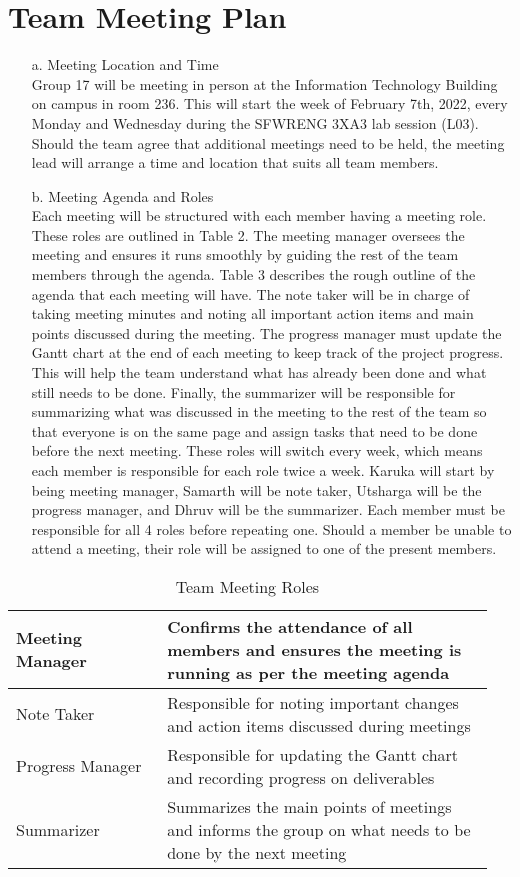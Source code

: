 \documentclass[12pt, titlepage]{article}
\begin{document}
\section{Team Meeting Plan}
\begin{itemize}
    \item[a.] Meeting Location and Time\\
		Group 17 will be meeting in person at the Information Technology Building on campus in room 236. This will start the week of February 7th, 2022, every Monday and Wednesday during the SFWRENG 3XA3 lab session (L03). Should the team agree that additional meetings need to be held, the meeting lead will arrange a time and location that suits all team members.  
    \item[b.] Meeting Agenda and Roles\\
		Each meeting will be structured with each member having a meeting role. These roles are outlined in Table 2. The meeting manager oversees the meeting and ensures it runs smoothly by guiding the rest of the team members through the agenda. Table 3 describes the rough outline of the agenda that each meeting will have. The note taker will be in charge of taking meeting minutes and noting all important action items and main points discussed during the meeting. The progress manager must update the Gantt chart at the end of each meeting to keep track of the project progress. This will help the team understand what has already been done and what still needs to be done. Finally, the summarizer will be responsible for summarizing what was discussed in the meeting to the rest of the team so that everyone is on the same page and assign tasks that need to be done before the next meeting. These roles will switch every week, which means each member is responsible for each role twice a week. Karuka will start by being meeting manager, Samarth will be note taker, Utsharga will be the progress manager, and Dhruv will be the summarizer. Each member must be responsible for all 4 roles before repeating one. Should a member be unable to attend a meeting, their role will be assigned to one of the present members. 
\end{itemize}

\begin{table}[ht]
    \centering
    \begin{tabular}{| p{0.3\linewidth} | p{0.65\linewidth} |}
		\hline
		Meeting Manager	  & Confirms the attendance of all members and ensures the meeting is running as per the meeting agenda \\ \hline
		Note Taker             & Responsible for noting important changes and action items discussed during meetings \\ \hline
		Progress Manager    & Responsible for updating the Gantt chart and recording progress on deliverables\\ \hline
		Summarizer            & Summarizes the main points of meetings and informs the group on what needs to be done by the next meeting\\ \hline
    \end{tabular}
    \caption{Team Meeting Roles}
    \label{tab:my_label}
\end{table}
\end{document}
